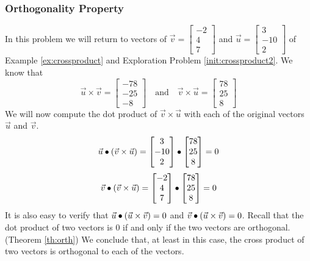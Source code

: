 \documentclass{ximera}
\begin{document}
\subsubsection*{Orthogonality Property}
\begin{exploration}\label{init:orthofcorssproduct}
In this problem we will return to vectors of $\vec{v}=\begin{bmatrix}-2\\ 4\\ 7\end{bmatrix}$ and $\vec{u}=\begin{bmatrix}3\\ -10\\ 2\end{bmatrix}$ of Example \ref{ex:crossproduct} and Exploration Problem \ref{init:crossproduct2}.  We know that
$$\vec{u}\times\vec{v}=\begin{bmatrix}-78\\-25\\-8\end{bmatrix}\quad\text{and}\quad\vec{v}\times\vec{u}=\begin{bmatrix}78\\25\\8\end{bmatrix}$$
We will now compute the dot product of $\vec{v}\times\vec{u}$ with each of the original vectors $\vec{u}$ and $\vec{v}$.
$$\vec{u}\bullet(\vec{v}\times\vec{u})=\begin{bmatrix}3\\ -10\\ 2\end{bmatrix}\bullet\begin{bmatrix}78\\25\\8\end{bmatrix}=0$$
$$\vec{v}\bullet(\vec{v}\times\vec{u})=\begin{bmatrix}-2\\ 4\\ 7\end{bmatrix}\bullet\begin{bmatrix}78\\25\\8\end{bmatrix}=0$$
It is also easy to verify that $\vec{u}\bullet(\vec{u}\times\vec{v})=0$ and $\vec{v}\bullet(\vec{u}\times\vec{v})=0$.  Recall that the dot product of two vectors is $0$ if and only if the two vectors are orthogonal. (Theorem \ref{th:orth})
We conclude that, at least in this case, the cross product of two vectors is orthogonal to each of the vectors. 
 
\end{exploration}
 
\end{document}
